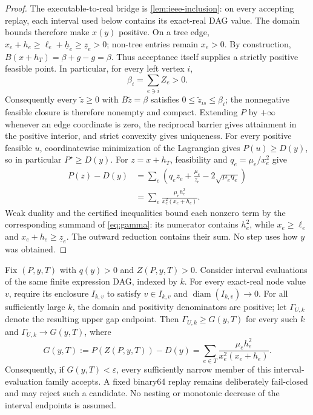 \documentclass[smallextended,envcountsect]{svjour3}
\begin{document}
\begin{proof}
The executable-to-real bridge is \cref{lem:ieee-inclusion}: on every accepting
replay, each interval used below contains its exact-real DAG value.  The domain
 bounds therefore make $x(y)$ positive.  On a tree edge,
 $x_e+h_e\ge\ell_e+\underline h_e\ge\underline z_e>0$; non-tree entries
 remain $x_e>0$.  By construction,
$B(x+h_T)=\beta+g-g=\beta$.  Thus acceptance itself supplies a strictly
positive feasible point.  In particular, for every left vertex $i$,
\[
 \beta_i=\sum_{e\ni i}Z_e>0.
\]
Consequently every $\widetilde z\ge0$ with $B\widetilde z=\beta$ satisfies
$0\le\widetilde z_{is}\le\beta_i$; the nonnegative feasible closure is
therefore nonempty and compact.  Extending $P$ by $+\infty$ whenever an edge
coordinate is zero, the reciprocal barrier gives attainment in the positive
interior, and strict convexity gives uniqueness.  For every positive feasible
$u$, coordinatewise minimization of the Lagrangian gives $P(u)\ge D(y)$, so in
particular $P^\star\ge D(y)$.  For $z=x+h_T$, feasibility and
$q_e=\mu_e/x_e^2$ give
\begin{align}
 P(z)-D(y)
 &=\sum_e\left(q_ez_e+\frac{\mu_e}{z_e}
              -2\sqrt{\mu_eq_e}\right) \\
 &=\sum_e\frac{\mu_eh_e^2}{x_e^2(x_e+h_e)}.
 \label{eq:gap-identity}
\end{align}
 Weak duality and the certified inequalities bound each nonzero term by the
 corresponding summand of \cref{eq:gamma}: its numerator contains $h_e^2$,
 while $x_e\ge\ell_e$ and $x_e+h_e\ge\underline z_e$.  The outward reduction contains their
 sum.  No step uses how $y$ was obtained.
\end{proof}

\begin{proposition}
\label{prop:asymptotic-completeness}
Fix $(P,y,T)$ with $q(y)>0$ and $Z(P,y,T)>0$.  Consider interval
evaluations of the same finite expression DAG, indexed by $k$.  For every
exact-real node value $v$, require its enclosure $I_{k,v}$ to satisfy
$v\in I_{k,v}$ and $\operatorname{diam}(I_{k,v})\to0$.  For all sufficiently
large $k$, the domain and positivity denominators are positive; let
$\Gamma_{U,k}$ denote the resulting upper gap endpoint.  Then
$\Gamma_{U,k}\ge G(y,T)$ for every such $k$ and
$\Gamma_{U,k}\to G(y,T)$, where
\begin{equation}
 G(y,T):=P(Z(P,y,T))-D(y)
 =\sum_{e\in T}\frac{\mu_eh_e^2}{x_e^2(x_e+h_e)}.
 \label{eq:exact-recovery-gap}
\end{equation}
Consequently, if $G(y,T)<\varepsilon$, every sufficiently narrow member of
this interval-evaluation family accepts.  A fixed binary64 replay remains
deliberately fail-closed and may
reject such a candidate.  No nesting or monotonic decrease of the interval
endpoints is assumed.
\end{proposition}
\end{document}
